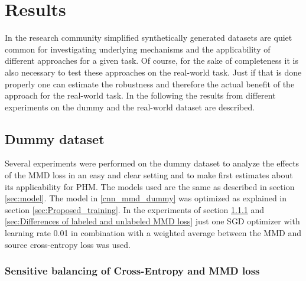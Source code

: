 \chapter{Results}\label{chapter:results}
In the research community simplified synthetically generated datasets are quiet common for investigating underlying mechanisms and the applicability of different approaches for a given task. Of course, for the sake of completeness it is also necessary to test these approaches on the real-world task. Just if that is done properly one can estimate the robustness and therefore the actual benefit of the approach for the real-world task. In the following the results from different experiments on the dummy and the real-world dataset are described.

\section{Dummy dataset}
Several experiments were performed on the dummy dataset to analyze the effects of the MMD loss in an easy and clear setting and to make first estimates about its applicability for PHM. The models used are the same as described in section \ref{sec:model}. The model in \ref{cnn_mmd_dummy} was optimized as explained in section \ref{sec:Proposed_training}. In the experiments of section \ref{sec:Balancing Cross-Entropy and MMD loss} and \ref{sec:Differences of labeled and unlabeled MMD loss} just one SGD optimizer with learning rate 0.01 in combination with a weighted average between the MMD and source cross-entropy loss was used.

\subsection{Sensitive balancing of Cross-Entropy and MMD loss} \label{sec:Balancing Cross-Entropy and MMD loss}

